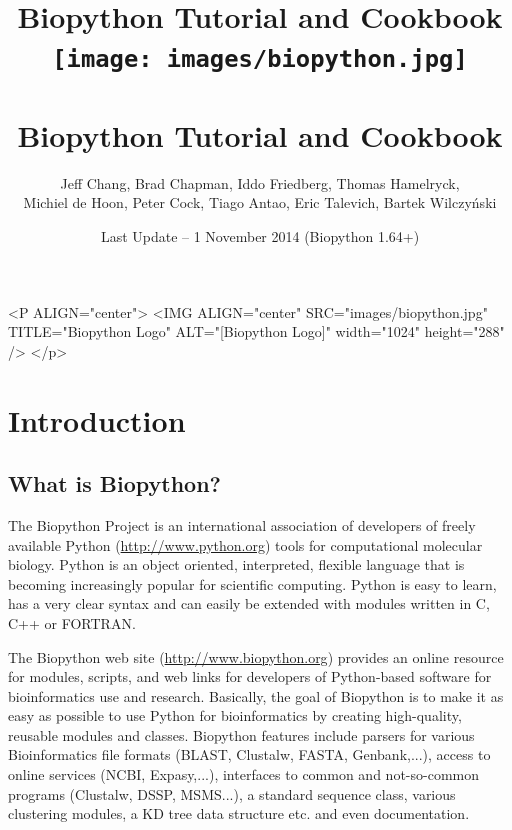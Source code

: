 \documentclass{report}
\begin{document}
\begin{htmlonly}
\title{Biopython Tutorial and Cookbook}
\end{htmlonly}
\begin{latexonly}
\title{
\texttt{[image: images/biopython.jpg]}\\
~\\
Biopython Tutorial and Cookbook}
\end{latexonly}

\author{Jeff Chang, Brad Chapman, Iddo Friedberg, Thomas Hamelryck, \\
Michiel de Hoon, Peter Cock, Tiago Antao, Eric Talevich, Bartek Wilczy\'{n}ski}
\date{Last Update -- 1 November 2014 (Biopython 1.64+)}

\begin{rawhtml}
<P ALIGN="center">
<IMG ALIGN="center" SRC="images/biopython.jpg" TITLE="Biopython Logo" ALT="[Biopython Logo]" width="1024" height="288" />
</p>
\end{rawhtml}

\maketitle
\tableofcontents

\chapter{Introduction}
\label{chapter:introduction}

\section{What is Biopython?}

The Biopython Project is an international association of developers of freely available Python (\url{http://www.python.org}) tools for computational molecular biology. Python is an object oriented, interpreted, flexible language that is becoming increasingly popular for scientific computing. Python is easy to learn, has a very clear syntax and can easily be extended with modules written in C, C++ or FORTRAN.

The Biopython web site (\url{http://www.biopython.org}) provides
an online resource for modules, scripts, and web links for developers
of Python-based software for bioinformatics use and research. Basically,
the goal of Biopython is to make it as easy as possible to use Python
for bioinformatics by creating high-quality, reusable modules and
classes. Biopython features include parsers for various Bioinformatics
file formats (BLAST, Clustalw, FASTA, Genbank,...), access to online
services (NCBI, Expasy,...), interfaces to common and not-so-common
programs (Clustalw, DSSP, MSMS...), a standard sequence class, various
clustering modules, a KD tree data structure etc. and even documentation. 
\end{document}
